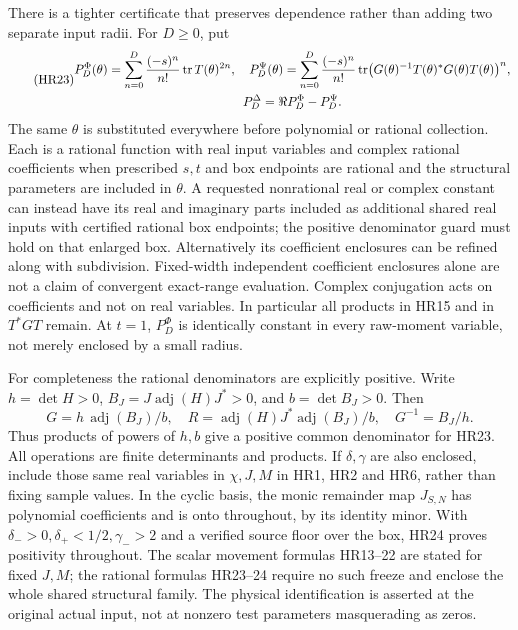 \documentclass[11pt]{article}
\begin{document}
There is a tighter certificate that preserves dependence rather than
adding two separate input radii. For \(D\ge0\), put
\begin{equation}\tag{HR23}\label{hrv:HR23}
\begin{gathered}
P_D^\Phi(\theta)=\sum_{n=0}^D\frac{(-s)^n}{n!}\operatorname{tr} T(\theta)^{2n},\quad
P_D^\Psi(\theta)=\sum_{n=0}^D\frac{(-s)^n}{n!}
\operatorname{tr}\bigl(G(\theta)^{-1}T(\theta)^*G(\theta)T(\theta)\bigr)^n,\\
P_D^\Delta=\Re P_D^\Phi-P_D^\Psi.
\end{gathered}
\end{equation}
The same \(\theta\) is substituted everywhere before polynomial or
rational collection. Each is a rational function with real input
variables and complex rational coefficients when prescribed
\(s,t\) and box endpoints are rational and the structural parameters
are included in \(\theta\). A requested nonrational real or complex
constant can instead have its real and imaginary parts included as
additional shared real inputs with certified rational box endpoints;
the positive denominator guard must hold on that enlarged box.
Alternatively its coefficient enclosures can be refined along with
subdivision. Fixed-width independent coefficient enclosures alone are
not a claim of convergent exact-range evaluation. Complex conjugation acts on
coefficients and not on real variables. In particular all products
in HR15 and in \(T^*GT\) remain. At \(t=1\), \(P_D^\Phi\) is
identically constant in every raw-moment variable, not merely enclosed
by a small radius.

For completeness the rational denominators are explicitly positive.
Write \(h=\det H>0\), \(B_J=J\operatorname{adj}(H)J^*>0\), and
\(b=\det B_J>0\). Then
\begin{equation}\tag{HR24}\label{hrv:HR24}
G=h\,\operatorname{adj}(B_J)/b,\quad
R=\operatorname{adj}(H)J^*\operatorname{adj}(B_J)/b,\quad
G^{-1}=B_J/h.
\end{equation}
Thus products of powers of \(h,b\) give a positive common denominator
for HR23. All operations are finite determinants and products.
If \(\delta,\gamma\) are also enclosed, include those same real
variables in \(\chi,J,M\) in HR1, HR2 and HR6, rather than fixing
sample values. In the cyclic basis, the monic remainder map \(J_{S,N}\)
has polynomial coefficients and is onto throughout, by its identity
minor. With \(\delta_->0,\delta_+<1/2,\gamma_->2\) and a verified
source floor over the box, HR24 proves positivity throughout.
The scalar movement formulas HR13--22 are stated for fixed \(J,M\);
the rational formulas HR23--24 require no such freeze and enclose the
whole shared structural family. The physical identification is asserted
at the original actual input, not at nonzero test parameters masquerading
as zeros.
\end{document}
